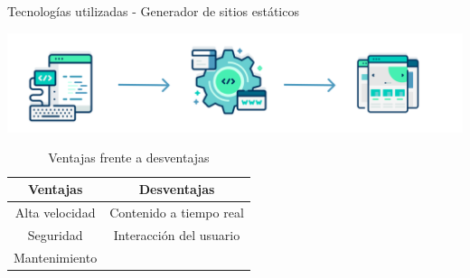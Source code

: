 \documentclass{beamer}
\begin{document}
        \begin{frame}{Tecnologías utilizadas - Generador de sitios estáticos}
        
    		\begin{center}
                \includegraphics[width=.8\textwidth]{Presentacion/tecnologias/ssg.png}\hfill
    		\end{center}  

            \begin{table}[!h]
                \centering
                \begin{tabular}{c|c}
                     Ventajas & Desventajas \\ \hline
                     Alta velocidad & Contenido a tiempo real \\
                     Seguridad & Interacción del usuario \\
                     Mantenimiento & \\
                \end{tabular}
                \caption{Ventajas frente a desventajas}
                \label{tab:ventajas}
            \end{table}
            
        \end{frame}
\end{document}
